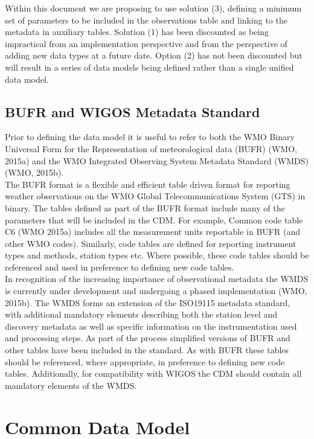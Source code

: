 \documentclass[a4paper]{article}
\begin{document}
Within this document we are proposing to use solution (3), defining a minimum set of parameters to be included in the observations table and linking to the metadata in auxiliary tables. Solution (1) has been discounted as being impractical from an implementation perspective and from the perspective of adding new data types at a future date. Option (2) has not been discounted but will result in a series of data models being defined rather than a single unified data model.\\



\subsection {BUFR and WIGOS Metadata Standard}
Prior to defining the data model it is useful to refer to both the WMO Binary Universal Form for the Representation of meteorological data (BUFR) (WMO, 2015a) and the WMO Integrated Observing System Metadata Standard (WMDS) (WMO, 2015b). \\

The BUFR format is a flexible and efficient table driven format for reporting weather observations on the WMO Global Telecommunications System (GTS) in binary. The tables defined as part of the BUFR format include many of the parameters that will be included in the CDM. For example, Common code table C6 (WMO 2015a) includes all the measurement units reportable in BUFR (and other WMO codes). Similarly, code tables are defined for reporting instrument types and methods, station types etc. Where possible, these code tables should be referenced and used in preference to defining new code tables.\\

In recognition of the increasing importance of observational metadata the WMDS is currently under development and undergoing a phased implementation (WMO, 2015b). The WMDS forms an extension of the ISO19115 metadata standard, with additional mandatory elements describing both the station level and discovery metadata as well as specific information on the instrumentation used and processing steps. As part of the process simplified versions of BUFR and other tables have been included in the standard. As with BUFR these tables should be referenced, where appropriate, in preference to defining new code tables. Additionally, for compatibility with WIGOS the CDM should contain all mandatory elements of the WMDS. 

\section {Common Data Model}
\end{document}
